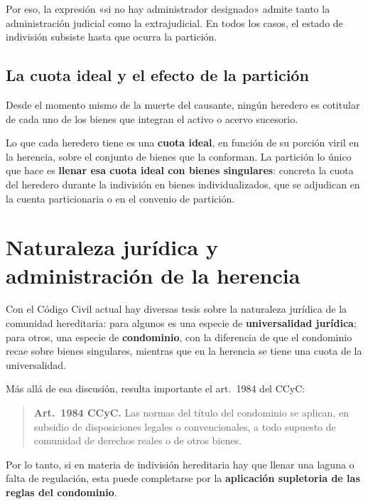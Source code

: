 \documentclass[12pt,oneside]{book}
\begin{document}
Por eso, la expresión «si no hay administrador designado» admite tanto la administración judicial como la extrajudicial. En todos los casos, el estado de indivisión subsiste hasta que ocurra la partición.

\subsection{La cuota ideal y el efecto de la partición}

Desde el momento mismo de la muerte del causante, ningún heredero es cotitular de cada uno de los bienes que integran el activo o acervo sucesorio.

\begin{important}
Lo que cada heredero tiene es una \textbf{cuota ideal}, en función de su porción viril en la herencia, sobre el conjunto de bienes que la conforman. La partición lo único que hace es \textbf{llenar esa cuota ideal con bienes singulares}: concreta la cuota del heredero durante la indivisión en bienes individualizados, que se adjudican en la cuenta particionaria o en el convenio de partición.
\end{important}

\section{Naturaleza jurídica y administración de la herencia}

Con el Código Civil actual hay diversas tesis sobre la naturaleza jurídica de la comunidad hereditaria: para algunos es una especie de \textbf{universalidad jurídica}; para otros, una especie de \textbf{condominio}, con la diferencia de que el condominio recae sobre bienes singulares, mientras que en la herencia se tiene una cuota de la universalidad.

Más allá de esa discusión, resulta importante el art.~1984 del CCyC:

\begin{quote}
\textbf{Art.~1984 CCyC.} Las normas del título del condominio se aplican, en subsidio de disposiciones legales o convencionales, a todo supuesto de comunidad de derechos reales o de otros bienes.
\end{quote}

Por lo tanto, si en materia de indivisión hereditaria hay que llenar una laguna o falta de regulación, esta puede completarse por la \textbf{aplicación supletoria de las reglas del condominio}.
\end{document}
